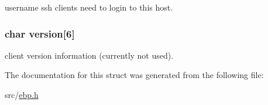 username ssh clients need to login to this host. 

\hypertarget{struct__user_a165e21f39fbada4a3730f571966fb4bb}{
\subsubsection[{version}]{\setlength{\rightskip}{0pt plus 5cm}char {\bf version}\mbox{[}6\mbox{]}}}\label{struct__user_a165e21f39fbada4a3730f571966fb4bb}


client version information (currently not used). 



\-The documentation for this struct was generated from the following file\-:\begin{DoxyCompactItemize}
\item 
src/\hyperlink{ebp_8h}{ebp.\-h}\end{DoxyCompactItemize}
